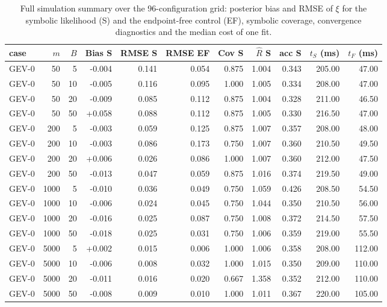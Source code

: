 \begin{table}[t]
\centering
\small
\caption{Full simulation summary over the 96-configuration grid: posterior bias and RMSE of $\xi$ for the symbolic likelihood (S) and the endpoint-free control (EF), symbolic coverage, convergence diagnostics and the median cost of one fit.}
\label{tab:sim-stat}
\begin{tabular}{lrrrrrrrrrr}
\toprule
case & $m$ & $B$ & Bias S & RMSE S & RMSE EF & Cov S & $\hat R$ S & acc S & $t_S$ (ms) & $t_F$ (ms) \\
\midrule
GEV-0 &   50 &    5 & -0.004 & 0.141 & 0.054 & 0.875 & 1.004 & 0.343 & 205.00 & 47.00 \\
GEV-0 &   50 &   10 & -0.005 & 0.116 & 0.095 & 1.000 & 1.005 & 0.334 & 208.00 & 47.00 \\
GEV-0 &   50 &   20 & -0.009 & 0.085 & 0.112 & 0.875 & 1.004 & 0.328 & 211.00 & 46.50 \\
GEV-0 &   50 &   50 & +0.058 & 0.088 & 0.112 & 0.875 & 1.005 & 0.330 & 216.50 & 47.00 \\
GEV-0 &  200 &    5 & -0.003 & 0.059 & 0.125 & 0.875 & 1.007 & 0.357 & 208.00 & 48.00 \\
GEV-0 &  200 &   10 & -0.003 & 0.086 & 0.173 & 0.750 & 1.007 & 0.360 & 210.50 & 49.50 \\
GEV-0 &  200 &   20 & +0.006 & 0.026 & 0.086 & 1.000 & 1.007 & 0.360 & 212.00 & 47.50 \\
GEV-0 &  200 &   50 & -0.013 & 0.047 & 0.059 & 0.875 & 1.016 & 0.374 & 219.50 & 49.00 \\
GEV-0 & 1000 &    5 & -0.010 & 0.036 & 0.049 & 0.750 & 1.059 & 0.426 & 208.50 & 54.50 \\
GEV-0 & 1000 &   10 & -0.006 & 0.024 & 0.045 & 0.750 & 1.044 & 0.350 & 210.50 & 56.00 \\
GEV-0 & 1000 &   20 & -0.016 & 0.025 & 0.087 & 0.750 & 1.008 & 0.372 & 214.50 & 57.50 \\
GEV-0 & 1000 &   50 & -0.018 & 0.025 & 0.031 & 0.750 & 1.006 & 0.359 & 219.00 & 55.50 \\
GEV-0 & 5000 &    5 & +0.002 & 0.015 & 0.006 & 1.000 & 1.006 & 0.358 & 208.00 & 112.00 \\
GEV-0 & 5000 &   10 & -0.006 & 0.008 & 0.032 & 1.000 & 1.015 & 0.350 & 209.00 & 110.00 \\
GEV-0 & 5000 &   20 & -0.011 & 0.016 & 0.020 & 0.667 & 1.358 & 0.352 & 212.00 & 110.00 \\
GEV-0 & 5000 &   50 & -0.008 & 0.009 & 0.010 & 1.000 & 1.011 & 0.367 & 220.00 & 105.00 \\

\end{tabular}
\end{table}
